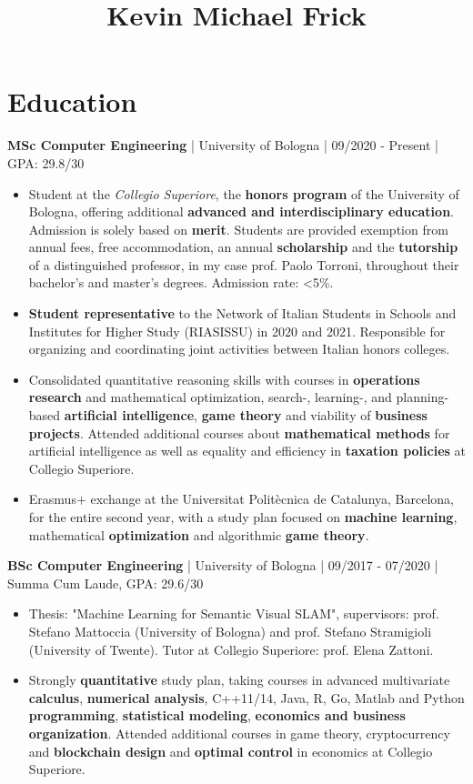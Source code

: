 \documentclass[10pt, a4paper]{extarticle}
\title{Kevin Michael Frick}
\author{}
\begin{document}
\maketitle
\vspace{-0.8em}
\hrulefill


\section*{Education}

\textbf{MSc Computer Engineering} | University of Bologna | 09/2020 - Present | GPA: 29.8/30
\begin{itemize}
\item Student at the \emph{Collegio Superiore}, the \textbf{honors program} of the University of Bologna, offering additional \textbf{advanced and interdisciplinary education}.
Admission is solely based on \textbf{merit}.
Students are provided exemption from annual fees, free accommodation, an annual \textbf{scholarship} and the \textbf{tutorship} of a distinguished professor, in my case prof. Paolo Torroni, throughout their bachelor's and master's degrees.
Admission rate: <5\%.
\item \textbf{Student representative} to the Network of Italian Students in Schools and Institutes for Higher Study (RIASISSU) in 2020 and 2021.
Responsible for organizing and coordinating joint activities between Italian honors colleges.
\item Consolidated quantitative reasoning skills with courses in \textbf{operations research} and mathematical optimization, search-, learning-, and planning-based \textbf{artificial intelligence}, \textbf{game theory} and viability of \textbf{business projects}.
Attended additional courses about \textbf{mathematical methods} for artificial intelligence as well as equality and efficiency in \textbf{taxation policies} at Collegio Superiore.
\item Erasmus+ exchange at the Universitat Politècnica de Catalunya, Barcelona, for the entire second year, with a study plan focused on \textbf{machine learning}, mathematical \textbf{optimization} and algorithmic \textbf{game theory}.

\end{itemize}
\textbf{BSc Computer Engineering} | University of Bologna | 09/2017 - 07/2020 | Summa Cum Laude, GPA: 29.6/30
\begin{itemize}
\item Thesis: "Machine Learning for Semantic Visual SLAM", supervisors: prof. Stefano Mattoccia (University of Bologna) and prof. Stefano Stramigioli (University of Twente). Tutor at Collegio Superiore: prof. Elena Zattoni.
\item Strongly \textbf{quantitative} study plan, taking courses in advanced multivariate \textbf{calculus}, \textbf{numerical analysis}, C++11/14, Java, R, Go, Matlab and Python \textbf{programming}, \textbf{statistical modeling}, \textbf{economics and business organization}.
Attended additional courses in game theory, cryptocurrency and \textbf{blockchain design} and \textbf{optimal control} in economics at Collegio Superiore.
\end{itemize}
\end{document}
